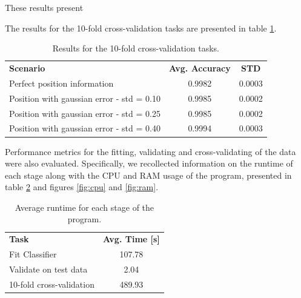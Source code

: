 \documentclass{kthreport}
\theoremstyle{definition}
\begin{document}
These results present 

The results for the \num{10}-fold cross-validation tasks are presented in table \ref{tbl:10foldcv}.

\begin{table}[thb]
    \centering
    \begin{tabular}{|l|c|c|}
        \hline 
        \textbf{Scenario} & \textbf{Avg. Accuracy} & \textbf{STD} \\ 
        Perfect position information & \num{0.9982} & \num{0.0003} \\ 
        Position with gaussian error - std = \num{0.10} & \num{0.9985} & \num{0.0002} \\ 
        Position with gaussian error - std = \num{0.25} & \num{0.9985} & \num{0.0002} \\ 
        Position with gaussian error - std = \num{0.40} & \num{0.9994} & \num{0.0003} \\ 
        \hline 
    \end{tabular}
    \caption{Results for the \num{10}-fold cross-validation tasks.}
    \label{tbl:10foldcv}
\end{table}

Performance metrics for the fitting, validating and cross-validating of the data were also evaluated. Specifically, we recollected information on the runtime of each stage along with the CPU and RAM usage of the program, presented in table \ref{tbl:runtime} and figures \ref{fig:cpu} and \ref{fig:ram}.

\begin{table} [thb]
    \centering
    \begin{tabular}{|l|c|}
        \hline
        \textbf{Task} & \textbf{Avg. Time [s]}\\ 
        Fit Classifier & \num{107.78} \\ 
        Validate on test data & \num{2.04} \\ 
        10-fold cross-validation & \num{489.93} \\ 
        \hline 
    \end{tabular} 
    \caption{Average runtime for each stage of the program.}
    \label{tbl:runtime}
\end{table}
\end{document}
